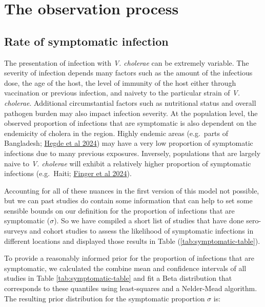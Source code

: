 \documentclass[
]{book}
\begin{document}
\section{The observation process}\label{the-observation-process}

\subsection{Rate of symptomatic infection}\label{rate-of-symptomatic-infection}

The presentation of infection with \emph{V. cholerae} can be extremely variable. The severity of infection depends many factors such as the amount of the infectious dose, the age of the host, the level of immunity of the host either through vaccination or previous infection, and naivety to the particular strain of \emph{V. cholerae}. Additional circumstantial factors such as nutritional status and overall pathogen burden may also impact infection severity. At the population level, the observed proportion of infections that are symptomatic is also dependent on the endemicity of cholera in the region. Highly endemic areas (e.g.~parts of Bangladesh; \href{https://www.nature.com/articles/s41591-024-02810-4}{Hegde et al 2024}) may have a very low proportion of symptomatic infections due to many previous exposures. Inversely, populations that are largely naive to \emph{V. cholerae} will exhibit a relatively higher proportion of symptomatic infections (e.g.~Haiti; \href{https://www.ncbi.nlm.nih.gov/pmc/articles/PMC10635253/}{Finger et al 2024}).

Accounting for all of these nuances in the first version of this model not possible, but we can past studies do contain some information that can help to set some sensible bounds on our definition for the proportion of infections that are symptomatic (\(\sigma\)). So we have compiled a short list of studies that have done sero-surveys and cohort studies to assess the likelihood of symptomatic infections in different locations and displayed those results in Table (\ref{tab:symptomatic-table}).

To provide a reasonably informed prior for the proportion of infections that are symptomatic, we calculated the combine mean and confidence intervals of all studies in Table \ref{tab:symptomatic-table} and fit a Beta distribution that corresponds to these quantiles using least-squares and a Nelder-Mead algorithm. The resulting prior distribution for the symptomatic proportion \(\sigma\) is:
\end{document}
